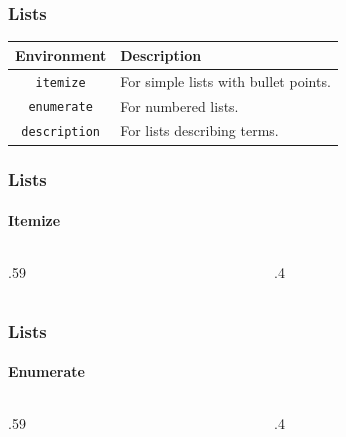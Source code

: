 \begin{frame}
    \frametitle{Lists}
    \centering
    \begin{tabular}{c l}
        \textbf{Environment}
        & \textbf{Description}\\
    \toprule[1.2pt]\pause
        \texttt{itemize}
        & For simple lists with bullet points.\\
    \midrule\pause
        \texttt{enumerate}
        & For numbered lists.\\
    \midrule\pause
        \texttt{description}
        & For lists describing terms.\\
    \end{tabular}

\end{frame}

\begin{frame}
    \frametitle{Lists}
    \framesubtitle{Itemize}
    \begin{columns}
        \begin{column}{.59\textwidth}
        \end{column}
        \begin{column}{.4\textwidth}
                        
        \end{column}
    \end{columns}
\end{frame}

\begin{frame}
    \frametitle{Lists}
    \framesubtitle{Enumerate}
    \begin{columns}
        \begin{column}{.59\textwidth}
        \end{column}
        \begin{column}{.4\textwidth}
                        
        \end{column}
    \end{columns}
\end{frame}

